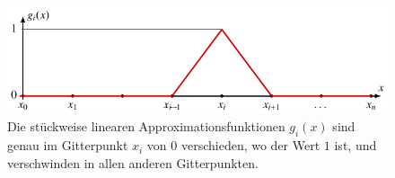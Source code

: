 %
%
%
\begin{figure}
\centering
\includegraphics{chapters/090-pdenumerik/images/linear.pdf}
\caption{Die stückweise linearen Approximationsfunktionen $g_i(x)$
sind genau im Gitterpunkt $x_i$ von $0$ verschieden, wo der Wert $1$ ist,
und verschwinden in allen anderen Gitterpunkten.
\label{buch:pdenumerik:fem:fig:linear}}
\end{figure}
